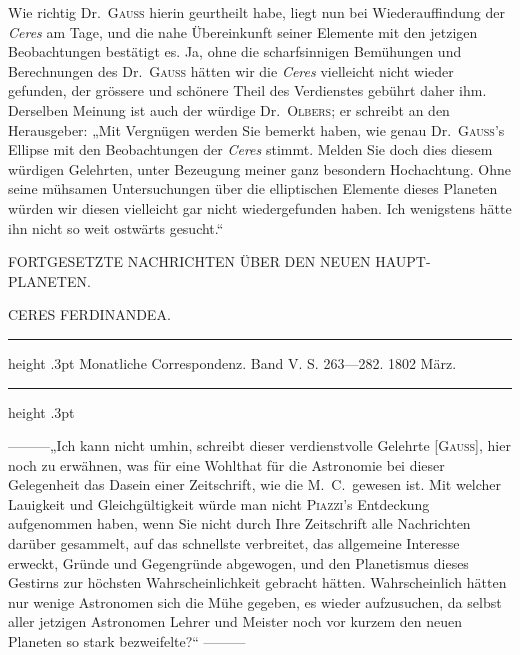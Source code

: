 Wie richtig Dr.\ \textsc{Gauss} hierin geurtheilt habe, liegt nun bei Wiederauffindung der \textit{Ceres} am Tage, und die nahe Übereinkunft seiner Elemente mit den jetzigen Beobachtungen bestätigt es. Ja, ohne die scharfsinnigen Bemühungen und Berechnungen des Dr.\ \textsc{Gauss} hätten wir die \textit{Ceres} vielleicht nicht wieder gefunden, der grössere und schönere Theil des Verdienstes gebührt daher ihm. Derselben Meinung ist auch der würdige Dr.\ \textsc{Olbers}; er schreibt an den Herausgeber: „Mit Vergnügen werden Sie bemerkt haben, wie genau Dr.\ \textsc{Gauss}'s Ellipse mit den Beobachtungen der \textit{Ceres} stimmt. Melden Sie doch dies diesem würdigen Gelehrten, unter Bezeugung meiner ganz besondern Hochachtung. Ohne seine mühsamen Untersuchungen über die elliptischen Elemente dieses Planeten würden wir diesen vielleicht gar nicht wiedergefunden haben. Ich wenigstens hätte ihn nicht so weit ostwärts gesucht.“
\begin{flushright}\end{flushright}

\bigskip{}
\begin{center}\small
FORTGESETZTE NACHRICHTEN ÜBER DEN NEUEN HAUPT-PLANETEN.\par
CERES FERDINANDEA.\par
\end{center}
\begin{center}\parbox{.80\linewidth}{\centering\footnotesize\frenchspacing
\hrule height .3pt\relax\vspace{2.5pt}
Monatliche Correspondenz. Band V. S. 263—282. 1802 März.\par
\vspace{2.5pt}\hrule height .3pt\relax
}\end{center}
—\quad —\quad —\quad „Ich kann nicht umhin, schreibt dieser verdienstvolle Gelehrte [\textsc{Gauss}], hier noch zu erwähnen, was für eine Wohlthat für die Astronomie bei dieser Gelegenheit das Dasein einer Zeitschrift, wie die M.\ C.\ gewesen ist. Mit welcher Lauigkeit und Gleichgültigkeit würde man nicht \textsc{Piazzi}'s Entdeckung aufgenommen haben, wenn Sie nicht durch Ihre Zeitschrift alle Nachrichten darüber gesammelt, auf das schnellste verbreitet, das allgemeine Interesse erweckt, Gründe und Gegengründe abgewogen, und den Planetismus dieses Gestirns zur höchsten Wahrscheinlichkeit gebracht hätten. Wahrscheinlich hätten nur wenige Astronomen sich die Mühe gegeben, es wieder aufzusuchen, da selbst aller jetzigen Astronomen Lehrer und Meister noch vor kurzem den neuen Planeten so stark bezweifelte?“ —\quad —\quad —

